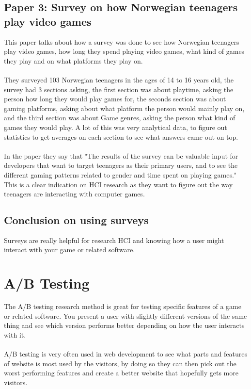 \documentclass{scrartcl}
\begin{document}
\subsection{Paper 3: Survey on how Norwegian teenagers play video games \cite{three}}
This paper talks about how a survey was done to see how Norwegian teenagers play video games, how long they spend playing video games, what kind of games they play and on what platforms they play on.
\\
\\
They surveyed 103 Norwegian teenagers in the ages of 14 to 16 years old, the survey had 3 sections asking, the first section was about playtime, asking the person how long they would play games for, the seconds section was about gaming platforms, asking about what platform the person would mainly play on, and the third section was about Game genres, asking the person what kind of games they would play.
A lot of this was very analytical data, to figure out statistics to get averages on each section to see what answers came out on top.
\\
\\
In the paper they say that "The results of the survey can be valuable input for developers that want to target teenagers as their primary users, and to see the different gaming patterns related to gender and time spent on playing games."
This is a clear indication on HCI research as they want to figure out the way teenagers are interacting with computer games.

\subsection{Conclusion on using surveys}
Surveys are really helpful for research HCI and knowing how a user might interact with your game or related software.

\section{A/B Testing}
The A/B testing research method is great for testing specific features of a game or related software. You present a user with slightly different versions of the same thing and see which version performs better depending on how the user interacts with it.
\\
\\
A/B testing is very often used in web development to see what parts and features of website is most used by the visitors, by doing so they can then pick out the worst performing features and create a better website that hopefully gets more visitors.
\end{document}
